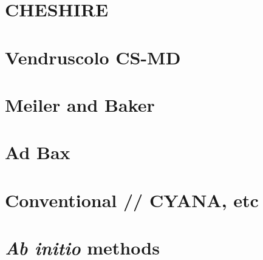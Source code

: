 \section{CHESHIRE}

\section{Vendruscolo CS-MD}

\section{Meiler and Baker}

\section{Ad Bax}

\section{Conventional // CYANA, etc}

\section{\textit{Ab initio} methods}


